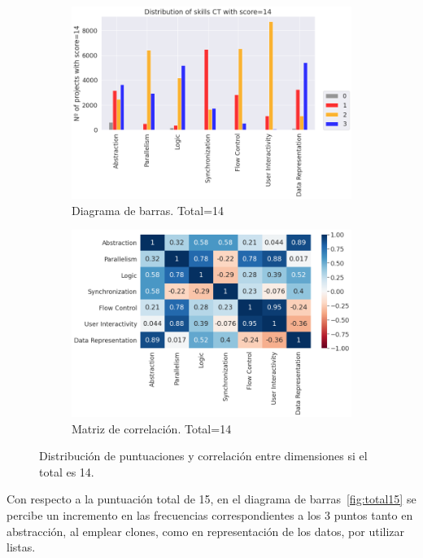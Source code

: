 \documentclass[a4paper, 12pt]{book}
\begin{document}
\begin{figure}[H]
    \centering
    \begin{subfigure}[h]{.49\textwidth} 
        \includegraphics[width=\textwidth]{img/distribucion_14_Scratch}
        \caption{Diagrama de barras. Total=14}
        \label{fig:total14}
    \end{subfigure}       
    \begin{subfigure}[h]{.49\textwidth} 
        \includegraphics[width=\textwidth]{img/corr_14_Scratch}
        \caption{Matriz de correlación. Total=14}
        \label{fig:corr14}
    \end{subfigure}
     \caption{Distribución de puntuaciones y correlación entre dimensiones si el total es 14.}
\end{figure}

Con respecto a la puntuación total de 15, en el diagrama de barras~\ref{fig:total15} se percibe un incremento en las frecuencias correspondientes a los 3 puntos tanto en abstracción, al emplear clones, como en representación de los datos, por utilizar listas.
\end{document}
